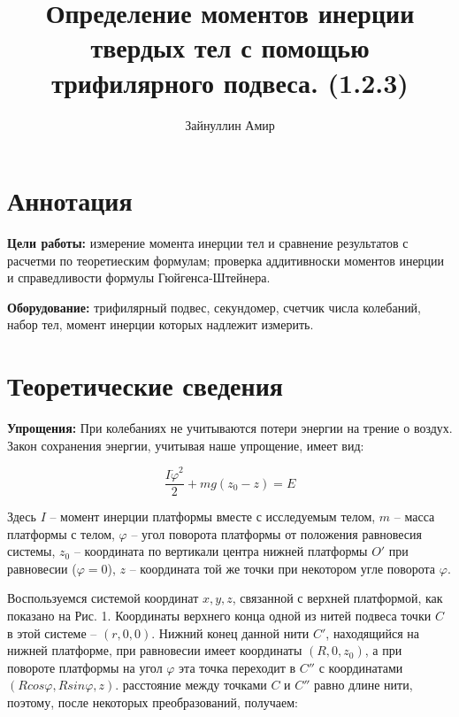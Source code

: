 \documentclass[a4paper,12pt]{article}
\title{\textbf{Определение моментов инерции твердых тел с помощью трифилярного подвеса. (1.2.3)}}
\author{Зайнуллин Амир}
\begin{document}
\maketitle

\section{Аннотация}
    \textbf{Цели работы:} измерение момента инерции тел и сравнение результатов с расчетми по теоретиеским формулам; проверка аддитивноски моментов инерции и справедливости формулы Гюйгенса-Штейнера. \par
	\textbf{Оборудование:} трифилярный подвес, секундомер, счетчик числа колебаний, набор тел, момент инерции которых надлежит измерить. \par

\section{Теоретические сведения}
    \textbf{Упрощения:} При колебаниях не учитываются потери энергии на трение о воздух. \\
    Закон сохранения энергии, учитывая наше упрощение, имеет вид:

    
    $$\frac{I\dot \varphi^2}{2} + mg(z_0-z) = E$$
    

    Здесь $I$ -- момент инерции платформы вместе с исследуемым телом, $m$ -- масса платформы с телом, $\varphi$ -- угол поворота платформы от положения равновесия системы, $z_0$ -- координата по вертикали центра нижней платформы $O'$  при равновесии ($\varphi = 0$), $z$ -- координата той же точки при некотором угле поворота $\varphi$. \par
    Воспользуемся системой координат $x, y, z$, связанной с верхней платформой, как показано на Рис. 1. Координаты верхнего конца одной из нитей подвеса точки $C$ в этой системе -- $(r, 0, 0)$. Нижний конец данной нити $C'$, находящийся на нижней платформе, при равновесии имеет координаты $(R, 0, z_0)$, а при повороте платформы на угол $\varphi$ эта точка переходит в $C''$ с координатами $(Rcos\varphi, Rsin\varphi, z)$. расстояние между точками $C$ и $C''$ равно длине нити, поэтому, после некоторых преобразований, получаем:
    
\end{document}
